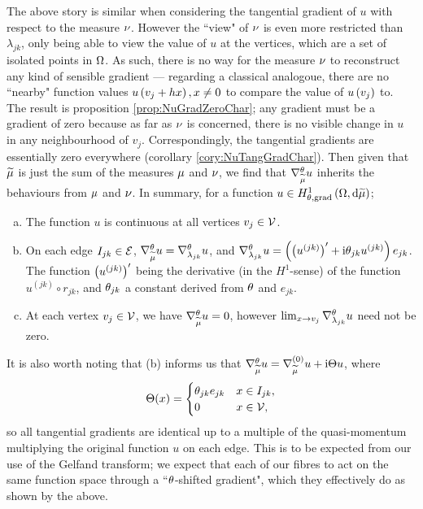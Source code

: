 The above story is similar when considering the tangential gradient of $u$ with respect to the measure $\nu$.
However the ``view" of $\nu$ is even more restricted than $\lambda_{jk}$, only being able to view the value of $u$ at the vertices, which are a set of isolated points in $\Omega$.
As such, there is no way for the measure $\nu$ to reconstruct any kind of sensible gradient --- regarding a classical analogoue, there are no ``nearby" function values $u\left( v_j + h x \right), x\neq 0$ to compare the value of $u\left( v_j \right)$ to.
The result is proposition \ref{prop:NuGradZeroChar}; any gradient must be a gradient of zero because as far as $\nu$ is concerned, there is no visible change in $u$ in any neighbourhood of $v_j$.
Correspondingly, the tangential gradients are essentially zero everywhere (corollary \ref{cory:NuTangGradChar}).
Then given that $\widetilde{\mu}$  is just the sum of the measures $\mu$ and $\nu$, we find that $\nabla^{\theta}_{\widetilde{\mu}}u$ inherits the behaviours from $\mu$ and $\nu$.
In summary, for a function $u\in H^1_{\theta, \mathrm{grad}}\left( \Omega, \mathrm{d}\widetilde{\mu} \right)$;
\begin{enumerate}[(a)]
	\item The function $u$ is continuous at all vertices $v_j\in\mathcal{V}$.
	\item On each edge $I_{jk}\in\mathcal{E}$, $\nabla^{\theta}_{\widetilde{\mu}}u = \nabla^{\theta}_{\lambda_{jk}}u$, and $\nabla^{\theta}_{\lambda_{jk}}u = \left( \left( u^{(jk)} \right)' + \mathrm{i}\theta_{jk}u^{(jk)} \right)e_{jk}$.
	The function $\left( u^{(jk)} \right)'$ being the derivative (in the $H^1$-sense) of the function $u^{(jk)}\circ r_{jk}$, and $\theta_{jk}$ a constant derived from $\theta$ and $e_{jk}$.
	\item At each vertex $v_j\in\mathcal{V}$, we have $\nabla^{\theta}_{\widetilde{\mu}}u=0$, however $\lim_{x\rightarrow v_j}\nabla^{\theta}_{\lambda_{jk}}u$ need not be zero.
\end{enumerate}
It is also worth noting that (b) informs us that $\nabla^{\theta}_{\widetilde{\mu}}u = \nabla^{(0)}_{\widetilde{\mu}}u + \mathrm{i}\Theta u$, where 
\begin{align*}
	\Theta(x) = 
	\begin{cases} \theta_{jk}e_{jk} & x\in I_{jk}, \\ 0 & x\in\mathcal{V}, \end{cases}
\end{align*}
so all tangential gradients are identical up to a multiple of the quasi-momentum multiplying the original function $u$ on each edge.
This is to be expected from our use of the Gelfand transform; we expect that each of our fibres to act on the same function space through a ``$\theta$-shifted gradient", which they effectively do as shown by the above.
